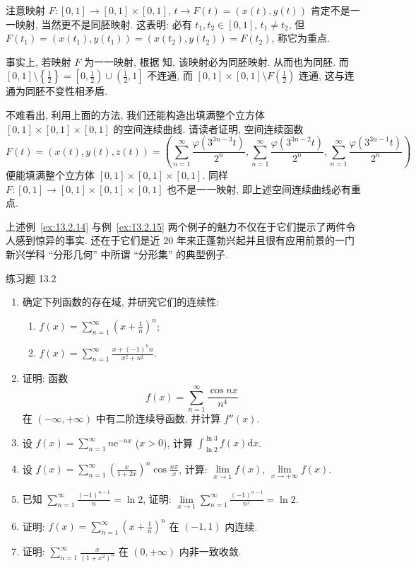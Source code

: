\begin{remark}\label{rem:13.2.2}
注意映射 $F\colon[0,1]\to[0,1]\times[0,1]$, $t\to F(t)=(x(t),y(t))$ 肯定不是一一映射, 当然更不是同胚映射. 这表明: 必有 $t_{1},t_{2}\in[0,1]$, $t_{1}\neq t_{2}$, 但 $F(t_{1})=(x(t_{1}),y(t_{1}))=(x(t_{2}),y(t_{2}))=F(t_{2})$, 称它为重点.

事实上, 若映射 $F$ 为一一映射, 根据 知, 该映射必为同胚映射. 从而也为同胚. 而 $[0,1]\setminus\left\{\frac{1}{2}\right\}=\left[0,\frac{1}{2}\right)\cup\left(\frac{1}{2},1\right]$ 不连通, 而 $[0,1]\times[0,1]\setminus F\left(\frac{1}{2}\right)$ 连通, 这与连通为同胚不变性相矛盾.

不难看出, 利用上面的方法, 我们还能构造出填满整个立方体 $[0,1]\times[0,1]\times[0,1]$ 的空间连续曲线. 请读者证明, 空间连续函数
\[
  F(t)=(x(t),y(t),z(t))=\left(\sum_{n=1}^{\infty}\frac{\varphi(3^{3n-3}t)}{2^{n}},\sum_{n=1}^{\infty}\frac{\varphi(3^{3n-2}t)}{2^{n}},\sum_{n=1}^{\infty}\frac{\varphi(3^{3n-1}t)}{2^{n}}\right)
\]
便能填满整个立方体 $[0,1]\times[0,1]\times[0,1]$. 同样 $F\colon[0,1]\to[0,1]\times[0,1]\times[0,1]$ 也不是一一映射, 即上述空间连续曲线必有重点.
\end{remark}

上述例~\ref{ex:13.2.14} 与例~\ref{ex:13.2.15} 两个例子的魅力不仅在于它们提示了两件令人感到惊异的事实. 还在于它们是近 20 年来正蓬勃兴起并且很有应用前景的一门新兴学科 ``分形几何'' 中所谓 ``分形集'' 的典型例子.

\begin{exblock}{练习题 13.2}
\begin{enumerate}
  \item 确定下列函数的存在域, 并研究它们的连续性:
  \begin{enumerate}
    \item $f(x)=\displaystyle\sum_{n=1}^{\infty}\left(x+\frac{1}{n}\right)^{n}$;
    \item $f(x)=\displaystyle\sum_{n=1}^{\infty}\frac{x+(-1)^{n}n}{x^{2}+n^{2}}$.
  \end{enumerate}
  \item 证明: 函数
  \[
    f(x)=\sum_{n=1}^{\infty}\frac{\cos nx}{n^{4}}
\]
  在 $(-\infty,+\infty)$ 中有二阶连续导函数, 并计算 $f''(x)$.
  \item 设 $f(x)=\sum_{n=1}^{\infty}n\mathrm{e}^{-nx}$ ($x>0$), 计算 $\int_{\ln2}^{\ln3}f(x)\mathrm{d}x$.
  \item 设 $f(x)=\sum_{n=1}^{\infty}\left(\frac{x}{1+2x}\right)^{n}\cos\frac{n\pi}{x}$, 计算: $\lim\limits_{x\to1}f(x)$, $\lim\limits_{x\to+\infty}f(x)$.
  \item 已知 $\sum_{n=1}^{\infty}\frac{(-1)^{n-1}}{n}=\ln2$, 证明: $\lim\limits_{x\to1}\sum_{n=1}^{\infty}\frac{(-1)^{n-1}}{n^{x}}=\ln2$.
  \item 证明: $f(x)=\sum_{n=1}^{\infty}\left(x+\frac{1}{n}\right)^{n}$ 在 $(-1,1)$ 内连续.
  \item 证明: $\sum_{n=1}^{\infty}\frac{x}{(1+x^{2})^{n}}$ 在 $(0,+\infty)$ 内非一致收敛.
\end{enumerate}
\end{exblock}

